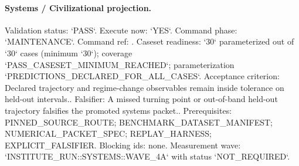 \paragraph{Systems / Civilizational projection.}
Validation status: `PASS`. Execute now: `YES`. Command phase: `MAINTENANCE`.
Command ref: .
Caseset readiness: `30` parameterized out of `30` cases (minimum `30`); coverage `PASS\_CASESET\_MINIMUM\_REACHED`; parameterization `PREDICTIONS\_DECLARED\_FOR\_ALL\_CASES`.
Acceptance criterion: Declared trajectory and regime-change observables remain inside tolerance on held-out intervals..
Falsifier: A missed turning point or out-of-band held-out trajectory falsifies the promoted systems packet..
Prerequisites: PINNED\_SOURCE\_ROUTE; BENCHMARK\_DATASET\_MANIFEST; NUMERICAL\_PACKET\_SPEC; REPLAY\_HARNESS; EXPLICIT\_FALSIFIER.
Blocking ids: none.
Measurement wave: `INSTITUTE\_RUN::SYSTEMS::WAVE\_4A` with status `NOT\_REQUIRED`.
